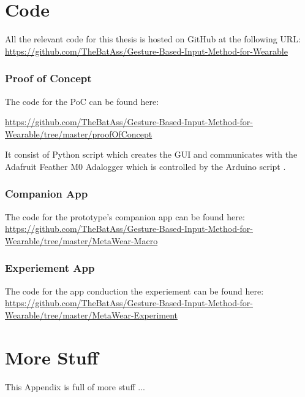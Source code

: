 \chapter{Code}
All the relevant code for this thesis is hosted on GitHub at the following URL:
\url{https://github.com/TheBatAss/Gesture-Based-Input-Method-for-Wearable}

\subsection{Proof of Concept}\label{poc_code}
The code for the PoC can be found here:

\url{https://github.com/TheBatAss/Gesture-Based-Input-Method-for-Wearable/tree/master/proofOfConcept}

It consist of Python script  which creates the GUI and communicates with the Adafruit Feather M0 Adalogger\cite{adalogger} which is controlled by the Arduino script .

\subsection{Companion App}\label{metawear_macro}
The code for the prototype's companion app  can be found here:
\url{https://github.com/TheBatAss/Gesture-Based-Input-Method-for-Wearable/tree/master/MetaWear-Macro}

\subsection{Experiement App}\label{metawear_Experiment}
The code for the app  conduction the experiement can be found here:
\url{https://github.com/TheBatAss/Gesture-Based-Input-Method-for-Wearable/tree/master/MetaWear-Experiment}



\chapter{More Stuff}


This Appendix is full of more stuff ...